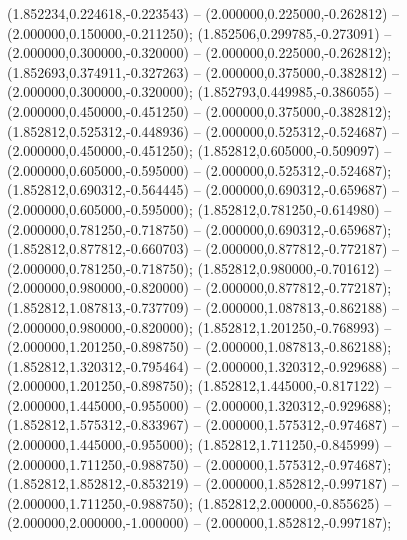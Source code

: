  (1.852234,0.224618,-0.223543) -- (2.000000,0.225000,-0.262812) -- (2.000000,0.150000,-0.211250);
 (1.852506,0.299785,-0.273091) -- (2.000000,0.300000,-0.320000) -- (2.000000,0.225000,-0.262812);
 (1.852693,0.374911,-0.327263) -- (2.000000,0.375000,-0.382812) -- (2.000000,0.300000,-0.320000);
 (1.852793,0.449985,-0.386055) -- (2.000000,0.450000,-0.451250) -- (2.000000,0.375000,-0.382812);
 (1.852812,0.525312,-0.448936) -- (2.000000,0.525312,-0.524687) -- (2.000000,0.450000,-0.451250);
 (1.852812,0.605000,-0.509097) -- (2.000000,0.605000,-0.595000) -- (2.000000,0.525312,-0.524687);
 (1.852812,0.690312,-0.564445) -- (2.000000,0.690312,-0.659687) -- (2.000000,0.605000,-0.595000);
 (1.852812,0.781250,-0.614980) -- (2.000000,0.781250,-0.718750) -- (2.000000,0.690312,-0.659687);
 (1.852812,0.877812,-0.660703) -- (2.000000,0.877812,-0.772187) -- (2.000000,0.781250,-0.718750);
 (1.852812,0.980000,-0.701612) -- (2.000000,0.980000,-0.820000) -- (2.000000,0.877812,-0.772187);
 (1.852812,1.087813,-0.737709) -- (2.000000,1.087813,-0.862188) -- (2.000000,0.980000,-0.820000);
 (1.852812,1.201250,-0.768993) -- (2.000000,1.201250,-0.898750) -- (2.000000,1.087813,-0.862188);
 (1.852812,1.320312,-0.795464) -- (2.000000,1.320312,-0.929688) -- (2.000000,1.201250,-0.898750);
 (1.852812,1.445000,-0.817122) -- (2.000000,1.445000,-0.955000) -- (2.000000,1.320312,-0.929688);
 (1.852812,1.575312,-0.833967) -- (2.000000,1.575312,-0.974687) -- (2.000000,1.445000,-0.955000);
 (1.852812,1.711250,-0.845999) -- (2.000000,1.711250,-0.988750) -- (2.000000,1.575312,-0.974687);
 (1.852812,1.852812,-0.853219) -- (2.000000,1.852812,-0.997187) -- (2.000000,1.711250,-0.988750);
 (1.852812,2.000000,-0.855625) -- (2.000000,2.000000,-1.000000) -- (2.000000,1.852812,-0.997187);
